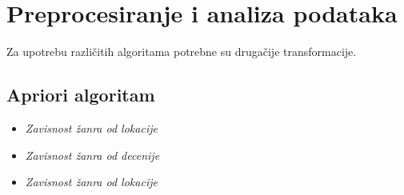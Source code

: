 \section{Preprocesiranje i analiza podataka}
\label{sec:Preprocesiranje}

Za upotrebu razli\v{c}itih algoritama potrebne su druga\v{c}ije transformacije.

\subsection{Apriori algoritam}
\label{subsec:Apriori}

\begin{itemize}
    \item \emph{Zavisnost \v{z}anra od lokacije}
    \item \emph{Zavisnost \v{z}anra od decenije} 
    \item \emph{Zavisnost \v{z}anra od lokacije} 
\end{itemize}
